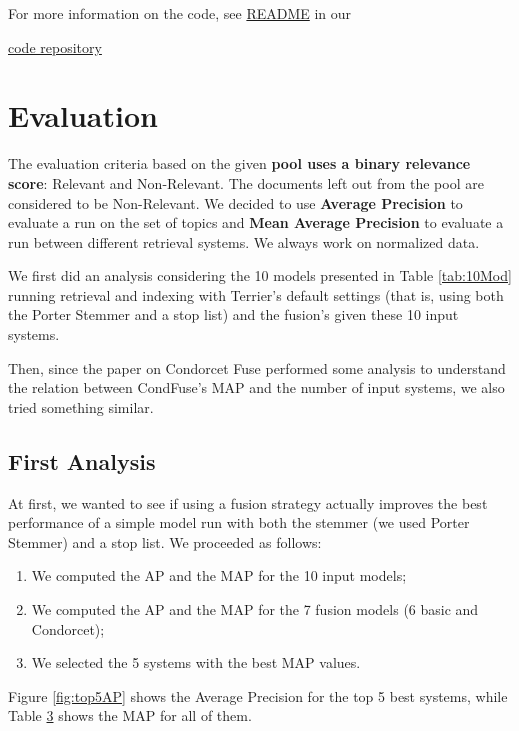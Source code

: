 For more information on the code, see \href{https://github.com/annabonaldo/IRCondorcetFuse/blob/master/README.md}{README} in our {\href{https://github.com/annabonaldo/IRCondorcetFuse}{code repository }
    \section{Evaluation}

	The evaluation criteria based on the given \textbf{pool uses a binary relevance score}:
	Relevant and Non-Relevant.
	The documents left out from the pool are considered to be Non-Relevant.
	We decided to use \textbf{Average Precision} to evaluate a run on the set of topics and \textbf{Mean Average Precision} to evaluate a run between different retrieval systems. We always work on normalized data.
	
	We first did an analysis considering the 10 models presented in Table \ref{tab:10Mod} running retrieval and indexing with Terrier's default settings (that is, using both the Porter Stemmer and a stop list) and the fusion's given these 10 input systems.
	
	Then, since the paper on Condorcet Fuse performed some analysis to understand the relation between CondFuse's MAP and the number of input systems, we also tried something similar. 
	
	\subsection{First Analysis}
	At first, we wanted to see if using a fusion strategy actually improves the best performance of a simple model run with both the stemmer (we used Porter Stemmer) and a stop list.
	We proceeded as follows:
	\begin{enumerate}
		\item We computed the AP and the MAP for the 10 input models;
		\item We computed the AP and the MAP for the 7 fusion models (6 basic and Condorcet);
		\item We selected the 5 systems with the best MAP values.
	\end{enumerate}
	Figure \ref{fig:top5AP} shows the Average Precision for the top 5 best systems, while Table \hyperref[tab:17SysMAP]{3} shows the MAP for all of them.
	
}
